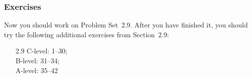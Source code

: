 \documentclass[serif,ignorenonframetext]{beamer}
\begin{document}
\begin{frame}
  \frametitle{Exercises}
  Now you should work on Problem Set~2.9.  After you have finished it,
  you should try the following additional exercises from Section~2.9:
  \begin{itemize}
  \item[2.9] C-level: 1--30; \\
    B-level: 31--34; \\
    A-level: 35--42
  \end{itemize}
\end{frame}
\end{document}

